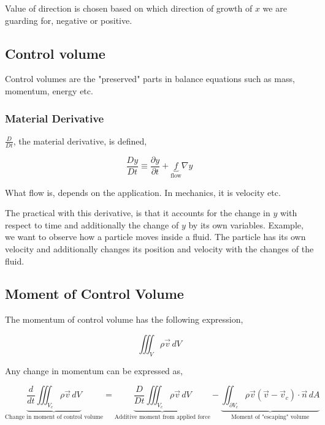 Value of direction is chosen based on which direction of growth of $x$ we are guarding for, negative or positive.

\subsection{Control volume}

Control volumes are the "preserved" parts in balance equations such as mass, momentum, energy etc.

\subsubsection{Material Derivative}
$\frac{D}{Dt}$, the material derivative, is defined,

\begin{equation}
    \frac{Dy}{Dt} \equiv \frac{\partial y}{\partial t} + \underbrace{f}_\text{flow} \nabla y
\end{equation} 

What flow is, depends on the application. In mechanics, it is velocity etc.

The practical with this derivative, is that it accounts for the change in $y$ with respect to time and additionally the change of $y$ by its own variables.
Example, we want to observe how a particle moves inside a fluid. The particle has its own velocity and additionally changes its position and velocity with the changes of the fluid.

\subsection{Moment of Control Volume}

The momentum of control volume has the following expression,

\begin{equation}
    \iiint_V \rho \Vec{v} \, dV
\end{equation}

Any change in momentum can be expressed as,

\begin{equation}
    \underbrace{\frac{d}{dt}\iiint_{V_c} \rho \Vec{v} \, dV}_\text{Change in moment of control volume} = \underbrace{\frac{D}{Dt}\iiint_{V_c} \rho \Vec{v} \, dV}_\text{Additive moment from applied force} - \underbrace{\iint_{\partial V_c} \rho \Vec{v}(\Vec{v} - \Vec{v}_c)\cdot\Vec{n} \, dA}_\text{Moment of "escaping" volume}
\end{equation}
    
